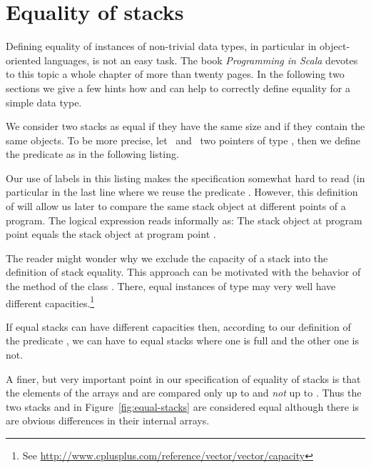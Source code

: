 
\section{Equality of stacks}

Defining equality of instances of non-trivial data types, in
particular in object-oriented languages, is not an easy task.
%
The book \emph{Programming in Scala}\cite[Chapter~28]{OderskyEtAl2008} 
devotes to this topic a whole chapter of more than twenty pages.
%
In the following two sections we give a few hints how \acsl
and \framac can help to
correctly define equality for a simple data type.

We consider two stacks as equal if they have the same size and if they contain the same objects.
%
To be more precise, let~ and~ two pointers of type \stacktype,
then we define the predicate \StackEqual as in the following listing.



Our use of labels in this listing makes
the specification somewhat hard to read (in particular in the last line
where we reuse the predicate .
%
However, this definition of \StackEqual will allow us later to compare 
the same stack object at different points of a program.
%
The logical expression 
reads informally as: 
{The stack object  at program point 
equals the stack object  at program point }.

The reader might wonder why we exclude the capacity of a stack
into the definition of stack equality.
This approach can be motivated with the behavior of the method
 of the class .
There, equal instances of type  may very well 
have different capacities.\footnote{
See \url{http://www.cplusplus.com/reference/vector/vector/capacity}
}

If equal stacks can have different capacities then, according to our
definition of the predicate , 
we can have to equal stacks where one is full and the other one is not.

A finer, but very important point in our specification of equality
of stacks is that the elements of the arrays  and 
are compared only up to  and \emph{not} up  to
.
Thus the two stacks  and  in Figure~\ref{fig:equal-stacks}
are considered
equal although there is are obvious differences in their internal arrays.

